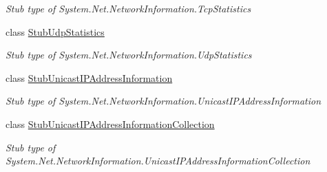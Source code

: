 \begin{DoxyCompactItemize}
\begin{DoxyCompactList}\small\item\em Stub type of System.\-Net.\-Network\-Information.\-Tcp\-Statistics\end{DoxyCompactList}\item 
class \hyperlink{class_system_1_1_net_1_1_network_information_1_1_fakes_1_1_stub_udp_statistics}{Stub\-Udp\-Statistics}
\begin{DoxyCompactList}\small\item\em Stub type of System.\-Net.\-Network\-Information.\-Udp\-Statistics\end{DoxyCompactList}\item 
class \hyperlink{class_system_1_1_net_1_1_network_information_1_1_fakes_1_1_stub_unicast_i_p_address_information}{Stub\-Unicast\-I\-P\-Address\-Information}
\begin{DoxyCompactList}\small\item\em Stub type of System.\-Net.\-Network\-Information.\-Unicast\-I\-P\-Address\-Information\end{DoxyCompactList}\item 
class \hyperlink{class_system_1_1_net_1_1_network_information_1_1_fakes_1_1_stub_unicast_i_p_address_information_collection}{Stub\-Unicast\-I\-P\-Address\-Information\-Collection}
\begin{DoxyCompactList}\small\item\em Stub type of System.\-Net.\-Network\-Information.\-Unicast\-I\-P\-Address\-Information\-Collection\end{DoxyCompactList}\end{DoxyCompactItemize}
